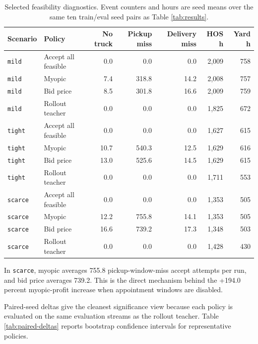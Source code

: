 \documentclass[11pt]{article}
\begin{document}
\begin{table}[t]
\centering
\caption{Selected feasibility diagnostics. Event counters and hours are seed
means over the same ten train/eval seed pairs as Table \ref{tab:results}.}
\scriptsize
\begin{tabular}{@{}llrrrrr@{}}
\toprule
Scenario & Policy & No truck & Pickup miss & Delivery miss & HOS h & Yard h \\
\midrule
\texttt{mild} & Accept all feasible & 0.0 & 0.0 & 0.0 & 2,009 & 758 \\
\texttt{mild} & Myopic & 7.4 & 318.8 & 14.2 & 2,008 & 757 \\
\texttt{mild} & Bid price & 8.5 & 301.8 & 16.6 & 2,009 & 759 \\
\texttt{mild} & Rollout teacher & 0.0 & 0.0 & 0.0 & 1,825 & 672 \\
\texttt{tight} & Accept all feasible & 0.0 & 0.0 & 0.0 & 1,627 & 615 \\
\texttt{tight} & Myopic & 10.7 & 540.3 & 12.5 & 1,629 & 616 \\
\texttt{tight} & Bid price & 13.0 & 525.6 & 14.5 & 1,629 & 615 \\
\texttt{tight} & Rollout teacher & 0.0 & 0.0 & 0.0 & 1,711 & 553 \\
\texttt{scarce} & Accept all feasible & 0.0 & 0.0 & 0.0 & 1,353 & 505 \\
\texttt{scarce} & Myopic & 12.2 & 755.8 & 14.1 & 1,353 & 505 \\
\texttt{scarce} & Bid price & 16.6 & 739.2 & 17.3 & 1,348 & 503 \\
\texttt{scarce} & Rollout teacher & 0.0 & 0.0 & 0.0 & 1,428 & 430 \\
\bottomrule
\end{tabular}
\label{tab:feasibility-diagnostics}
\end{table}

In \texttt{scarce}, myopic averages 755.8 pickup-window-miss accept attempts
per run, and bid price averages 739.2. This is the direct mechanism behind the
+194.0 percent myopic-profit increase when appointment windows are disabled.

Paired-seed deltas give the cleanest significance view because each policy is
evaluated on the same evaluation streams as the rollout teacher. Table
\ref{tab:paired-deltas} reports bootstrap confidence intervals for
representative policies.
\end{document}
